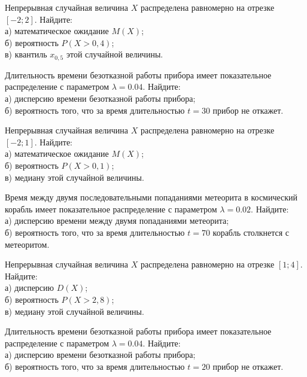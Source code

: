 \vfill

\newpage\setcounter{zad}{0}

\z Непрерывная случайная величина $X$ распределена равномерно на отрезке $[-2; 2]$. Найдите: \\ \quad а) математическое ожидание $M(X)$; \\ \quad б) вероятность $P(X>0{,}4)$; \\ \quad в) квантиль $x_{0{,}5}$ этой случайной величины.


\vfill

\z Длительность времени безотказной работы прибора имеет показательное распределение с параметром $\lambda = 0.04$. Найдите: \\ \quad а) дисперсию времени безотказной работы прибора; \\ \quad б) вероятность того, что за время длительностью $t = 30$ прибор не откажет.
 

\vfill

\newpage\setcounter{zad}{0}

\z Непрерывная случайная величина $X$ распределена равномерно на отрезке $[-2; 1]$. Найдите: \\ \quad а) математическое ожидание $M(X)$; \\ \quad б) вероятность $P(X>0{,}1)$; \\ \quad в) медиану этой случайной величины.


\vfill

\z Время между двумя последовательными попаданиями метеорита в космический корабль имеет показательное распределение с параметром $\lambda = 0.02$. Найдите: \\ \quad а) дисперсию времени между двумя попаданиями метеорита; \\ \quad б) вероятность того, что за время длительностью $t = 70$ корабль  столкнется с метеоритом.
 

\vfill

\newpage\setcounter{zad}{0}

\z Непрерывная случайная величина $X$ распределена равномерно на отрезке $[1; 4]$. Найдите: \\ \quad а) дисперсию $D(X)$; \\ \quad б) вероятность $P(X>2{,}8)$; \\ \quad в) медиану этой случайной величины.


\vfill

\z Длительность времени безотказной работы прибора имеет показательное распределение с параметром $\lambda = 0.04$. Найдите: \\ \quad а) дисперсию времени безотказной работы прибора; \\ \quad б) вероятность того, что за время длительностью $t = 20$ прибор не откажет.
 

